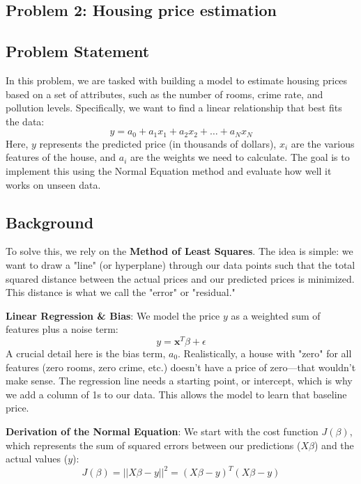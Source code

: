 \documentclass[11pt,a4paper]{article}
\begin{document}
\begin{raggedright}

\section{Problem 2: Housing price estimation}

\subsection{Problem Statement}
In this problem, we are tasked with building a model to estimate housing prices based on a set of attributes, such as the number of rooms, crime rate, and pollution levels. Specifically, we want to find a linear relationship that best fits the data:
\[ y = a_0 + a_1x_1 + a_2x_2 + \dots + a_Nx_N \]
Here, $y$ represents the predicted price (in thousands of dollars), $x_i$ are the various features of the house, and $a_i$ are the weights we need to calculate. The goal is to implement this using the Normal Equation method and evaluate how well it works on unseen data.

\subsection{Background}
To solve this, we rely on the \textbf{Method of Least Squares}. The idea is simple: we want to draw a "line" (or hyperplane) through our data points such that the total squared distance between the actual prices and our predicted prices is minimized. This distance is what we call the "error" or "residual."

\textbf{Linear Regression & Bias}:
We model the price $y$ as a weighted sum of features plus a noise term:
\[ y = \mathbf{x}^T \beta + \epsilon \]
A crucial detail here is the bias term, $a_0$. Realistically, a house with "zero" for all features (zero rooms, zero crime, etc.) doesn't have a price of zero—that wouldn't make sense. The regression line needs a starting point, or intercept, which is why we add a column of 1s to our data. This allows the model to learn that baseline price.

\textbf{Derivation of the Normal Equation}:
We start with the cost function $J(\beta)$, which represents the sum of squared errors between our predictions ($X\beta$) and the actual values ($y$):
\[ J(\beta) = ||X\beta - y||^2 = (X\beta - y)^T(X\beta - y) \]


\end{raggedright}
\end{document}
